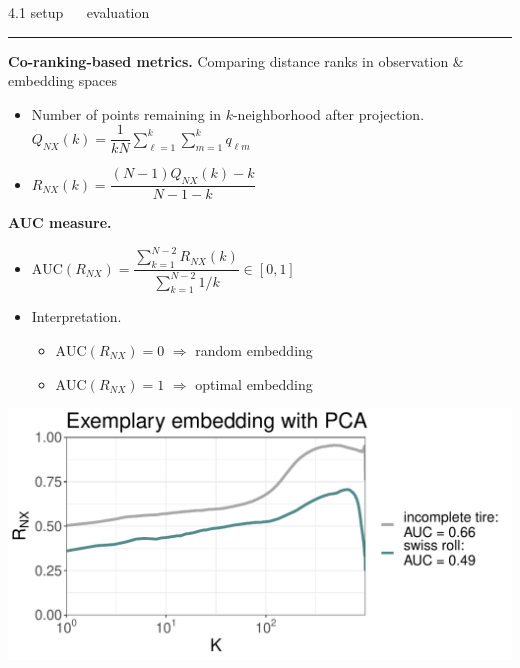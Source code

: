 \documentclass[11pt, compress, t, notes = noshow, xcolor = table, 
aspectratio = 1610]{beamer}
\newcommand{\highlight}[1]{\textcolor{highlightcol}{\textbf{#1}}}
\newcommand{\arritem}{\item[\highlight{$\rightarrow$}]}
\newcommand{\flexitem}[1]{\item[$\highlight{#1}$]}
\begin{document}
\LARGE
\begin{frame}{\textcolor{gray!90}{4.1 setup} ~~ evaluation}
\normalsize
\vspace{-0.5cm}
\noindent \textcolor{gray!90}{\rule{\textwidth}{1pt}}
\smallskip

\textbf{Co-ranking-based metrics.} Comparing distance ranks in observation \& 
embedding spaces

\begin{itemize}
  \arritem Number of points remaining in $k$-neighborhood after projection. 
  $Q_{NX}(k) = \dfrac{1}{kN} \sum_{\ell = 1}^k \sum_{m = 1}^k 
  q_{\ell m}$
  \arritem 
  $R_{NX}(k) = \dfrac{(N - 1) Q_{NX}(k) - k}{N - 1 - k}$
\end{itemize}

\vspace{0.3cm}

\begin{minipage}[b]{0.6\textwidth}
  \textbf{AUC measure.} %
  \begin{itemize}
    \arritem $\text{AUC}(R_{NX}) = \dfrac{\sum_{k = 1}^{N - 2} R_{NX}(k)}{
    \sum_{k = 1}^{N - 2} 1 / k} \in [0, 1]$
    \arritem Interpretation.
    \begin{itemize}
      \flexitem{1} $\text{AUC}(R_{NX}) = 0$ $\Rightarrow$ random embedding
      \flexitem{2} $\text{AUC}(R_{NX}) = 1$ $\Rightarrow$ optimal embedding
    \end{itemize}
\end{itemize}
\end{minipage}%
\begin{minipage}[b]{0.4\textwidth}
  \includegraphics[trim = 0 0 0 0, clip, %
    width = \textwidth]{figures/rnx_curve}
\end{minipage}

\end{frame}
\end{document}
